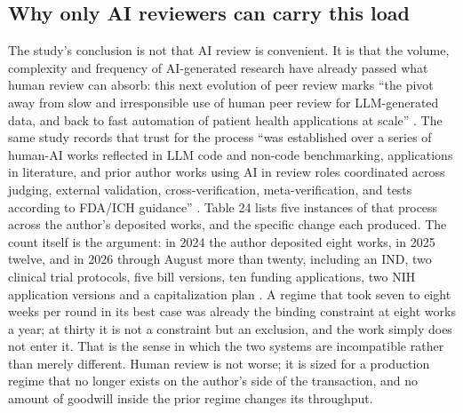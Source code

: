 \subsection{Why only AI reviewers can carry this load}

The study's conclusion is not that AI review is convenient. It is that the
volume, complexity and frequency of AI-generated research have already passed
what human review can absorb: this next evolution of peer review marks ``the
pivot away from slow and irresponsible use of human peer review for
LLM-generated data, and back to fast automation of patient health applications
at scale'' \cite{aiprgliomatc}. The same study records that trust for the
process ``was established over a series of human-AI works reflected in LLM code
and non-code benchmarking, applications in literature, and prior author works
using AI in review roles coordinated across judging, external validation,
cross-verification, meta-verification, and tests according to FDA/ICH guidance''
\cite{aiprgliomatc, e2eefficiency2025, gbmsynergy2025}. Table 24 lists five
instances of that process across the author's deposited works, and the specific
change each produced. The count itself is the argument: in 2024 the author
deposited eight works, in 2025 twelve, and in 2026 through August more than
twenty, including an IND, two clinical trial protocols, five bill versions, ten
funding applications, two NIH application versions and a capitalization plan
\cite{repo2026}. A regime that took seven to eight weeks per round in its best
case was already the binding constraint at eight works a year; at thirty it is
not a constraint but an exclusion, and the work simply does not enter it. That
is the sense in which the two systems are incompatible rather than merely
different. Human review is not worse; it is sized for a production regime that
no longer exists on the author's side of the transaction, and no amount of
goodwill inside the prior regime changes its throughput.

